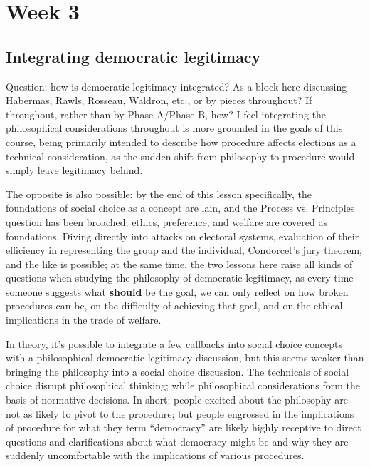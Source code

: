 \section{Week 3}

\subsection{Integrating democratic legitimacy}

Question:  how is democratic legitimacy integrated?  As a block here discussing Habermas, Rawls, Rosseau, Waldron, etc., or by pieces throughout?  If throughout, rather than by Phase A/Phase B, how?  I feel integrating the philosophical considerations throughout is more grounded in the goals of this course, being primarily intended to describe how procedure affects elections as a technical consideration, as the sudden shift from philosophy to procedure would simply leave legitimacy behind.

The opposite is also possible:  by the end of this lesson specifically, the foundations of social choice as a concept are lain, and the Process vs. Principles question has been broached; ethics, preference, and welfare are covered as foundations.  Diving directly into attacks on electoral systems, evaluation of their efficiency in representing the group and the individual, Condorcet's jury theorem, and the like is possible; at the same time, the two lessons here raise all kinds of questions when studying the philosophy of democratic legitimacy, as every time someone suggests what \textbf{should} be the goal, we can only reflect on how broken procedures can be, on the difficulty of achieving that goal, and on the ethical implications in the trade of welfare.

In theory, it's possible to integrate a few callbacks into social choice concepts with a philosophical democratic legitimacy discussion, but this seems weaker than bringing the philosophy into a social choice discussion.  The technicals of social choice disrupt philosophical thinking; while philosophical considerations form the basis of normative decisions.  In short: people excited about the philosophy are not as likely to pivot to the procedure; but people engrossed in the implications of procedure for what they term ``democracy'' are likely highly receptive to direct questions and clarifications about what democracy might be and why they are suddenly uncomfortable with the implications of various procedures.